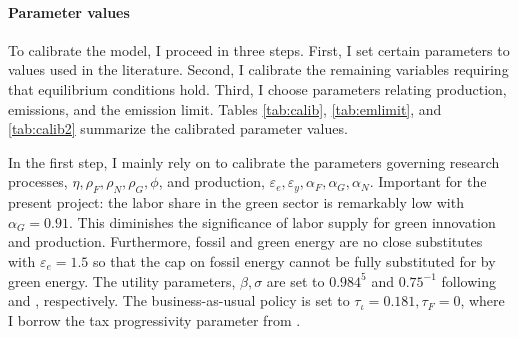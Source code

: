 \paragraph{Parameter values}
To calibrate the model, I proceed in three steps. First, I set certain parameters to values used in the literature. Second, I calibrate the remaining variables requiring that equilibrium conditions hold. Third, I choose parameters relating production, emissions, and the emission limit. Tables \ref{tab:calib}, \ref{tab:emlimit}, and \ref{tab:calib2} summarize the calibrated parameter values.

In the first step, I mainly rely on \cite{Fried2018ClimateAnalysis} to calibrate the parameters governing research processes, $\eta, \rho_F,\rho_N, \rho_G, \phi $, and production, $\varepsilon_e, \varepsilon_y, \alpha_F, \alpha_G, \alpha_N$.  Important for the present project: the labor share in the green sector is remarkably low with $\alpha_G=0.91$. This diminishes the significance of labor supply for green innovation and production. Furthermore, fossil and green energy are no close substitutes with $\varepsilon_e=1.5$ so that the cap on fossil energy cannot be fully substituted for by green energy. The utility parameters, $\beta, \sigma$ are set to $0.984^5$ and $0.75^{-1}$ following \cite{Barrage2019OptimalPolicy} and \cite{Chetty2011AreMargins}, respectively. The business-as-usual policy is set to $\tau_\iota=0.181, \tau_F=0$, where I borrow the tax progressivity parameter from \cite{Heathcote2017OptimalFramework}. 

